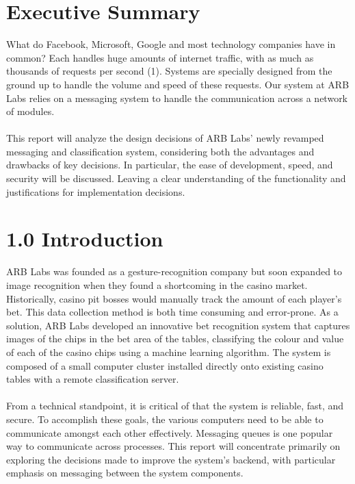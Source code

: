 \documentclass[12pt]{report}
\begin{document}

\newpage\thispagestyle{fancy}\sectionfont{\scshape}
\section*{Executive Summary}
What do Facebook, Microsoft, Google and most technology companies have in common? Each handles huge amounts of internet traffic, with as much as thousands of requests per second (1). Systems are specially designed from the ground up to handle the volume and speed of these requests. Our system at ARB Labs relies on a messaging system to handle the communication across a network of modules. \\ \\ \noindent
This report will analyze the design decisions of ARB Labs' newly revamped messaging and classification system, considering both the advantages and drawbacks of key decisions. In particular, the ease of development, speed, and security will be discussed. Leaving a clear understanding of the functionality and justifications for implementation decisions.



\newpage\thispagestyle{fancy}\sectionfont{\scshape}

\setcounter{page}{1}
\fancyfoot[C]{\thepage}

\section*{1.0 Introduction}
\par\indent
ARB Labs was founded as a gesture-recognition company but soon expanded to image recognition when they found a shortcoming in the casino market. Historically, casino pit bosses would manually track the amount of each player's bet. This data collection method is both time consuming and error-prone. As a solution, ARB Labs developed an innovative bet recognition system that captures images of the chips in the bet area of the tables,  classifying the colour and value of each of the casino chips using a machine learning algorithm. The system is composed of a small computer cluster installed directly onto existing casino tables with a remote classification server.\\ \\ \noindent
From a technical standpoint, it is critical of that the system is reliable, fast, and secure. To accomplish these goals, the various computers need to be able to communicate amongst each other effectively. Messaging queues is one popular way to communicate across processes. This report will concentrate primarily on exploring the decisions made to improve the system's backend, with particular emphasis on messaging between the system components. \\ \par\noindent
\end{document}
